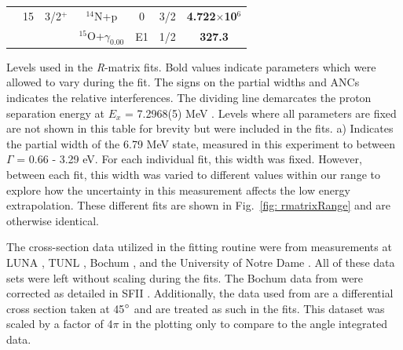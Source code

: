 \begin{table}[]
\begin{center}
\begin{threeparttable}
\begin{tabular}{c  c  c  c  c  c  c}
& {15}	&	3/2$^+$	&	$^{14}$N+p	&	0	&	3/2	&	\textbf{4.722$\times$10$^6$}\\
	&	&	&	$^{15}$O+$\gamma_{0.00}$	&	E1	&	1/2	&	\textbf{327.3}	\\
\bottomrule
\end{tabular}
\begin{tablenotes}
\small 
\item Levels used in the \textit{R}-matrix fits. Bold values indicate parameters which were allowed to vary during the fit. The signs on the partial widths and ANCs indicates the relative interferences. The dividing line demarcates the proton separation energy at $E_x$ = 7.2968(5) MeV \cite{Ajzenberg-Selove1991}. Levels where all parameters are fixed are not shown in this table for brevity but were included in the fits. a) Indicates the partial width of the 6.79 MeV state, measured in this experiment to between $\Gamma$ = 0.66 - 3.29 eV. For each individual fit, this width was fixed. However, between each fit, this width was varied to different values within our range to explore how the uncertainty in this measurement affects the low energy extrapolation. These different fits are shown in Fig.\ \ref{fig: rmatrixRange} and are otherwise identical.
\end{tablenotes}
\end{threeparttable}
\label{table: fitParams}
\end{center}
\end{table}  



The cross-section data utilized in the fitting routine were from measurements at LUNA \cite{Formicola2004, Imbriani2005, Marta2008, Marta2011}, TUNL \cite{Runkle2005}, Bochum \cite{Schroder1987}, and the University of Notre Dame \cite{Li2016}. All of these data sets were left without scaling during the fits. The Bochum data from \citet{Schroder1987} were corrected as detailed in SFII \cite{Adelberger2011}. Additionally, the data used from \citet{Li2016} are a differential cross section taken at 45$\degree$ and are treated as such in the fits. This dataset was scaled by a factor of 4$\pi$ in the plotting only to compare to the angle integrated data. 



